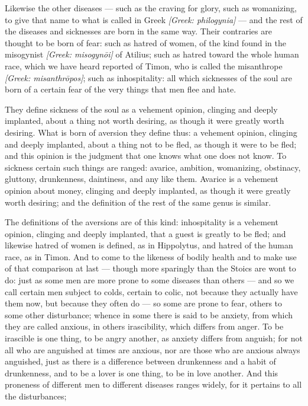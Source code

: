  Likewise the other diseases — such as the craving for glory, such as womanizing, to give that name to what is called in Greek \textit{[Greek: philogynia]} — and the rest of the diseases and sicknesses are born in the same way. Their contraries are thought to be born of fear: such as hatred of women, of the kind found in the misogynist \textit{[Greek: misogynōi]} of Atilius; such as hatred toward the whole human race, which we have heard reported of Timon, who is called the misanthrope \textit{[Greek: misanthrōpos]}; such as inhospitality: all which sicknesses of the soul are born of a certain fear of the very things that men flee and hate.

 They define sickness of the soul as a vehement opinion, clinging and deeply implanted, about a thing not worth desiring, as though it were greatly worth desiring. What is born of aversion they define thus: a vehement opinion, clinging and deeply implanted, about a thing not to be fled, as though it were to be fled; and this opinion is the judgment that one knows what one does not know. To sickness certain such things are ranged: avarice, ambition, womanizing, obstinacy, gluttony, drunkenness, daintiness, and any like them. Avarice is a vehement opinion about money, clinging and deeply implanted, as though it were greatly worth desiring; and the definition of the rest of the same genus is similar.

 The definitions of the aversions are of this kind: inhospitality is a vehement opinion, clinging and deeply implanted, that a guest is greatly to be fled; and likewise hatred of women is defined, as in Hippolytus, and hatred of the human race, as in Timon. And to come to the likeness of bodily health and to make use of that comparison at last — though more sparingly than the Stoics are wont to do: just as some men are more prone to some diseases than others — and so we call certain men subject to colds, certain to colic, not because they actually have them now, but because they often do — so some are prone to fear, others to some other disturbance; whence in some there is said to be anxiety, from which they are called anxious, in others irascibility, which differs from anger. To be irascible is one thing, to be angry another, as anxiety differs from anguish; for not all who are anguished at times are anxious, nor are those who are anxious always anguished, just as there is a difference between drunkenness and a habit of drunkenness, and to be a lover is one thing, to be in love another. And this proneness of different men to different diseases ranges widely, for it pertains to all the disturbances;

